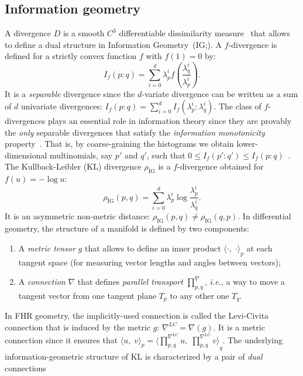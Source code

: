 \documentclass[graybox]{svmult}
\def\LC{\mathrm{LC}}
\def\Finner#1#2#3{{\langle {#1},\;{#2} \rangle}_{#3}}
\def\IG{\mathrm{IG}}
\begin{document}
\subsection{Information geometry}

A divergence $D$ is a smooth $C^3$ differentiable dissimilarity measure~\cite{DivIG-2010}
that allows to define a dual structure in Information Geometry~(IG;\;\cite{HessianStructure-2007,IG-2014,IG-2016}).
A $f$-divergence is defined for a strictly convex function $f$ with $f(1)=0$ by:
$$
I_f(p:q)=\sum_{i=0}^{d} \lambda_p^i f\left(\frac{\lambda_q^i}{\lambda_p^i}\right). 
$$
It is a {\em separable} divergence since the $d$-variate divergence can be written as a sum of $d$ univariate divergences: 
$I_f(p:q)=\sum_{i=0}^{d} I_f( \lambda_p^i: \lambda_q^i)$.
The class of $f$-divergences plays an essential role in information theory since they are provably the {\em only} separable divergences that satisfy
 the {\em information monotonicity} property~\cite{IG-2016,SeparableDivergence-2016}. 
That is, by coarse-graining the histograms  
we obtain lower-dimensional multinomials, say $p'$ and $q'$, such that $0\leq I_f(p':q')\leq  I_f(p:q)$~\cite{IG-2016}.
The Kullback-Leibler (KL) divergence $\rho_{\IG}$ is a $f$-divergence obtained for $f(u)=-\log u$:
\begin{equation}
\rho_{\IG}(p,q) = \sum_{i=0}^d \lambda_p^i \log\frac{\lambda_p^i}{\lambda_q^i}.
\end{equation}
It is an asymmetric non-metric distance: $\rho_{\IG}(p,q)\not =\rho_{\IG}(q,p)$.
In differential geometry, the structure of a manifold is defined by two components: 
\begin{enumerate}
\item A {\em metric tensor} $g$ that allows to define an inner product $\Finner{\cdot}{\cdot}{p}$ at each tangent space (for measuring vector lengths and angles between vectors); 
\item A {\em connection} $\nabla$ that defines 
{\em parallel transport} $\prod_{p,q}^\nabla$, {\it i.e.}, a way to move a tangent vector from
one tangent plane $T_p$ to any other one $T_q$.
\end{enumerate}
In FHR geometry, the implicitly-used connection is called the Levi-Civita connection that is induced by the metric $g$: $\nabla^{LC}=\nabla(g)$.
It is a metric connection since it ensures that $\Finner{u}{v}{p}=\Finner{\prod_{p,q}^{\nabla^\LC} u}{\prod_{p,q}^{\nabla^\LC} v}{q}$. 
The underlying information-geometric structure of KL is characterized by a pair of \emph{dual} connections~\cite{IG-2016} 
\end{document}
